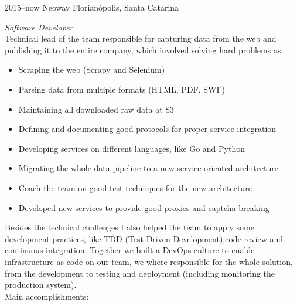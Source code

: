 \documentclass[]{friggeri-cv} %
\begin{document}
\begin{entrylist}
\entry
{2015--now}
{Neoway}
{Florianópolis, Santa Catarina}
{\emph{Software Developer} \\

    Technical lead of the team responsible for capturing data from the web and publishing it to the entire company,
which involved solving hard problems as:\\

\begin{itemize}
    \item Scraping the web (Scrapy and Selenium)
    \item Parsing data from multiple formats (HTML, PDF, SWF)
    \item Maintaining all downloaded raw data at S3
    \item Defining and documenting good protocols for proper service integration
    \item Developing services on different languages, like Go and Python
    \item Migrating the whole data pipeline to a new service oriented architecture
    \item Coach the team on good test techniques for the new architecture
    \item Developed new services to provide good proxies and captcha breaking
\end{itemize}

Besides the technical challenges I also helped the team to apply some
development practices, like TDD (Test Driven Development),code review
and continuous integration.
Together we built a DevOps culture to enable infrastructure as code
on our team, we where responsible for the whole solution, from the development
to testing and deployment (including monitoring the production system).\\

Main accomplishments:

}
\end{entrylist}
\end{document}
